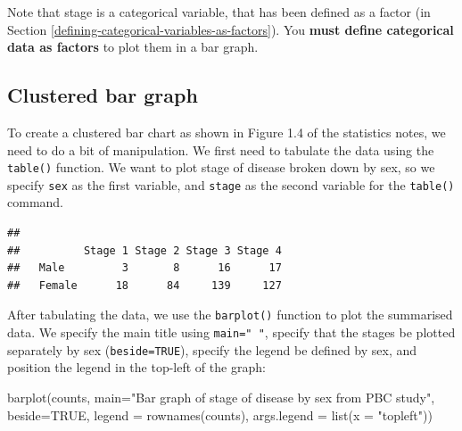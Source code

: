 \documentclass[
]{memoir}
\newenvironment{Shaded}{\begin{snugshade}}{\end{snugshade}}
\newcommand{\AttributeTok}[1]{\textcolor[rgb]{0.77,0.63,0.00}{#1}}
\newcommand{\ConstantTok}[1]{\textcolor[rgb]{0.00,0.00,0.00}{#1}}
\newcommand{\FunctionTok}[1]{\textcolor[rgb]{0.00,0.00,0.00}{#1}}
\newcommand{\NormalTok}[1]{#1}
\newcommand{\OtherTok}[1]{\textcolor[rgb]{0.56,0.35,0.01}{#1}}
\newcommand{\SpecialCharTok}[1]{\textcolor[rgb]{0.00,0.00,0.00}{#1}}
\newcommand{\StringTok}[1]{\textcolor[rgb]{0.31,0.60,0.02}{#1}}
\begin{document}
Note that stage is a categorical variable, that has been defined as a factor (in Section \ref{defining-categorical-variables-as-factors}). You \textbf{must define categorical data as factors} to plot them in a bar graph.

\hypertarget{clustered-bar-graph}{%
\subsection{Clustered bar graph}\label{clustered-bar-graph}}

To create a clustered bar chart as shown in Figure 1.4 of the statistics notes, we need to do a bit of manipulation. We first need to tabulate the data using the \texttt{table()} function. We want to plot stage of disease broken down by sex, so we specify \texttt{sex} as the first variable, and \texttt{stage} as the second variable for the \texttt{table()} command.

\begin{Shaded}
\end{Shaded}

\begin{verbatim}
##         
##          Stage 1 Stage 2 Stage 3 Stage 4
##   Male         3       8      16      17
##   Female      18      84     139     127
\end{verbatim}

After tabulating the data, we use the \texttt{barplot()} function to plot the summarised data. We specify the main title using \texttt{main="\ "}, specify that the stages be plotted separately by sex (\texttt{beside=TRUE}), specify the legend be defined by sex, and position the legend in the top-left of the graph:

\begin{Shaded}
\begin{Highlighting}[]
\FunctionTok{barplot}\NormalTok{(counts, }\AttributeTok{main=}\StringTok{"Bar graph of stage of disease by sex from PBC study"}\NormalTok{,}
        \AttributeTok{beside=}\ConstantTok{TRUE}\NormalTok{, }\AttributeTok{legend =} \FunctionTok{rownames}\NormalTok{(counts), }\AttributeTok{args.legend =} \FunctionTok{list}\NormalTok{(}\AttributeTok{x =} \StringTok{"topleft"}\NormalTok{))}
\end{Highlighting}
\end{Shaded}
\end{document}
